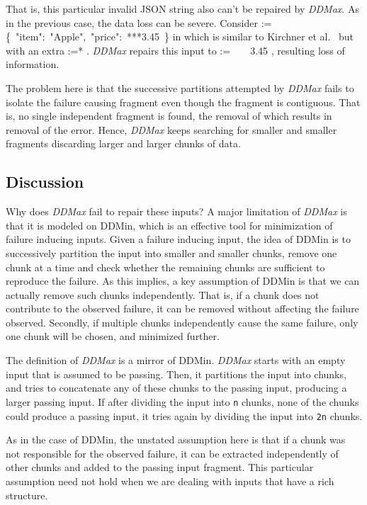 \documentclass[sigconf,review,anonymous]{acmart}
\makeatletter
\def\<#1>{\texttt{#1}}
\newcommand{\ddmin}{\textit{ddmin}\xspace}
\def\ddmin{DDMin\xspace}
\newcommand{\ddmax}{\textit{DDMax}\xspace}
\newcommand\letterboxed[1]{%
\setlength{\fboxsep}{0pt}%
  \@tfor\@ii:=#1\do{%
    \fcolorbox{white}{light-gray}{\texttt{\strut\@ii}}%
  }%
}
\makeatother
\begin{document}
That is, this particular invalid JSON string also can't be repaired by \ddmax.
As in the previous case, the data loss can be severe.
Consider
\letterboxed{\{\ "item":\ "Apple",\ "price":\ ***3.45\ \}} in
 which is similar to
Kirchner et al.~\cite[Figure 1]{kirschner2020debugging} but with an extra
\letterboxed{*}. \ddmax repairs this input to \letterboxed{\ \ \ \ 3.45},
resulting loss of information.

The problem here is that the successive partitions attempted by \ddmax fails to
isolate the failure causing fragment even though the fragment is contiguous.
That is, no single independent fragment is found, the removal of which results
in removal of the error. Hence, \ddmax keeps searching for smaller and smaller
fragments discarding larger and larger chunks of data.

\subsection{Discussion}
Why does \ddmax fail to repair these inputs? A major limitation of \ddmax is
that it is modeled on \ddmin, which is an effective tool for minimization of
failure inducing inputs. Given a failure inducing input, the idea of \ddmin is
to successively partition the input into smaller and smaller chunks, remove one
chunk at a time and check whether the remaining chunks are sufficient to
reproduce the failure. As this implies, a key assumption of \ddmin is that
we can actually remove such chunks independently. That is, if a chunk does not
contribute to the observed failure, it can be removed without affecting the
failure observed. Secondly, if multiple chunks independently cause
the same failure, only one chunk will be chosen, and minimized further.

The definition of \ddmax is a mirror of \ddmin. \ddmax starts with an empty
input that is assumed to be passing. Then, it partitions the input into chunks,
and tries to concatenate any of these chunks to the passing input, producing a
larger passing input. If after dividing the input into \<n> chunks, none of the
chunks could produce a passing input, it tries again by dividing the
input into \<2n> chunks.

As in the case of \ddmin, the unstated assumption here is that if a chunk was
not responsible for the observed failure, it can be extracted independently of
other chunks and added to the passing input fragment. This particular
assumption need not hold when we are dealing with inputs that have a rich
structure.
\end{document}
